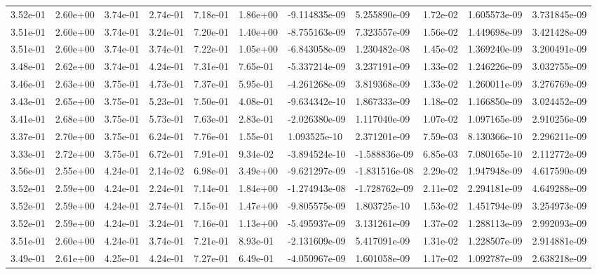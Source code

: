 \begin{longtable}{| p{} | p{} |}
3.52e-01 & 2.60e+00 & 3.74e-01 & 2.74e-01 & 7.18e-01 & 1.86e+00 & -9.114835e-09 &  5.255890e-09 &  1.72e-02 &  1.605573e-09 &  3.731845e-09 \\
3.51e-01 & 2.60e+00 & 3.74e-01 & 3.24e-01 & 7.20e-01 & 1.40e+00 & -8.755163e-09 &  7.323557e-09 &  1.56e-02 &  1.449698e-09 &  3.421428e-09 \\
3.51e-01 & 2.60e+00 & 3.74e-01 & 3.74e-01 & 7.22e-01 & 1.05e+00 & -6.843058e-09 &  1.230482e-08 &  1.45e-02 &  1.369240e-09 &  3.200491e-09 \\
3.48e-01 & 2.62e+00 & 3.74e-01 & 4.24e-01 & 7.31e-01 & 7.65e-01 & -5.337214e-09 &  3.237191e-09 &  1.33e-02 &  1.246226e-09 &  3.032755e-09 \\
3.46e-01 & 2.63e+00 & 3.75e-01 & 4.73e-01 & 7.37e-01 & 5.95e-01 & -4.261268e-09 &  3.819368e-09 &  1.33e-02 &  1.260011e-09 &  3.276769e-09 \\
3.43e-01 & 2.65e+00 & 3.75e-01 & 5.23e-01 & 7.50e-01 & 4.08e-01 & -9.634342e-10 &  1.867333e-09 &  1.18e-02 &  1.166850e-09 &  3.024452e-09 \\
3.41e-01 & 2.68e+00 & 3.75e-01 & 5.73e-01 & 7.63e-01 & 2.83e-01 & -2.026380e-09 &  1.117040e-09 &  1.07e-02 &  1.097165e-09 &  2.910256e-09 \\
3.37e-01 & 2.70e+00 & 3.75e-01 & 6.24e-01 & 7.76e-01 & 1.55e-01 &  1.093525e-10 &  2.371201e-09 &  7.59e-03 &  8.130366e-10 &  2.296211e-09 \\
3.33e-01 & 2.72e+00 & 3.75e-01 & 6.72e-01 & 7.91e-01 & 9.34e-02 & -3.894524e-10 & -1.588836e-09 &  6.85e-03 &  7.080165e-10 &  2.112772e-09 \\
3.56e-01 & 2.55e+00 & 4.24e-01 & 2.14e-02 & 6.98e-01 & 3.49e+00 & -9.621297e-09 & -1.831516e-08 &  2.29e-02 &  1.947948e-09 &  4.617590e-09 \\
3.52e-01 & 2.59e+00 & 4.24e-01 & 2.24e-01 & 7.14e-01 & 1.84e+00 & -1.274943e-08 & -1.728762e-09 &  2.11e-02 &  2.294181e-09 &  4.649288e-09 \\
3.52e-01 & 2.59e+00 & 4.24e-01 & 2.74e-01 & 7.15e-01 & 1.47e+00 & -9.805575e-09 &  1.803725e-10 &  1.53e-02 &  1.451794e-09 &  3.254973e-09 \\
3.52e-01 & 2.59e+00 & 4.24e-01 & 3.24e-01 & 7.16e-01 & 1.13e+00 & -5.495937e-09 &  3.131261e-09 &  1.37e-02 &  1.288113e-09 &  2.992093e-09 \\
3.51e-01 & 2.60e+00 & 4.24e-01 & 3.74e-01 & 7.21e-01 & 8.93e-01 & -2.131609e-09 &  5.417091e-09 &  1.31e-02 &  1.228507e-09 &  2.914881e-09 \\
3.49e-01 & 2.61e+00 & 4.25e-01 & 4.24e-01 & 7.27e-01 & 6.49e-01 & -4.050967e-09 &  1.601058e-09 &  1.17e-02 &  1.092787e-09 &  2.638218e-09 \\

\end{longtable}
